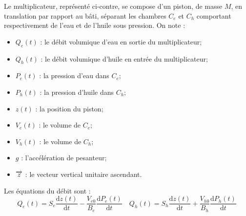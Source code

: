 \documentclass[10pt,fleqn]{article} %
\begin{document}
\begin{minipage}[c]{.65\linewidth}
Le multiplicateur, représenté ci-contre, se compose d’un piston, de masse $M$, en translation par rapport au bâti, séparant les chambres $C_e$ et $C_h$ comportant respectivement de l’eau et de l’huile sous pression.
On note :
\begin{itemize}
\item $Q_e(t)$ : le débit volumique d’eau en sortie du multiplicateur;
\item $Q_h(t)$ : le débit volumique d’huile en entrée du multiplicateur;
\item $P_e(t)$ : la pression d’eau dans $C_e$;
\item $P_h(t)$ : la pression d’huile dans $C_h$;
\item $z(t)$ : la position du piston;
\item $V_e(t)$ : le volume de $C_e$;
\item $V_h(t)$ : le volume de $C_h$;
\item $g$ : l’accélération de pesanteur;
\item $\overrightarrow{z}$ : le vecteur vertical unitaire ascendant.
\end{itemize}

Les équations du débit sont : 
$$
	Q_e (t)=S_e\dfrac{\text{d}z(t)}{\text{d}t}-\dfrac{V_{e0}}{B_e}   \dfrac{\text{d}P_e (t)}{\text{d}t}
\quad
	Q_h (t)=S_h\dfrac{\text{d}z(t)}{\text{d}t}+\dfrac{V_{h0}}{B_h}   \dfrac{\text{d}P_h (t)}{\text{d}t}
$$
\end{minipage}\hfill
\end{document}
